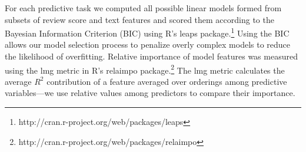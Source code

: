 \documentclass{sig-alternate}
\begin{document}
For each predictive task we computed all possible linear models formed from subsets of review score and text features and scored them according to the Bayesian Information Criterion (BIC) using R's leaps package.\footnote{http://cran.r-project.org/web/packages/leaps} Using the BIC allows our model selection process to penalize overly complex models to reduce the likelihood of overfitting. Relative importance of model features was measured using the lmg metric in R's relaimpo package.\footnote{http://cran.r-project.org/web/packages/relaimpo} The lmg metric calculates the average $R^2$ contribution of a feature averaged over orderings among predictive variables---we use relative values among predictors to compare their importance.


\end{document}
